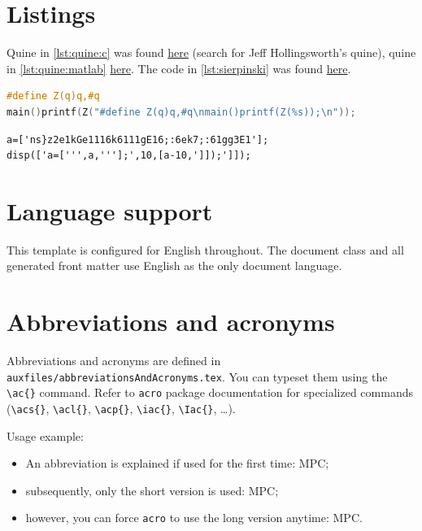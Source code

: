 \section{Listings}
Quine in \cref{lst:quine:c} was found \href{https://www.nyx.net/~gthompso/self_c.txt}{here} (search for Jeff Hollingsworth's quine),
quine in \cref{lst:quine:matlab} \href{http://blog.garritys.org/2009/10/quines.html}{here}. The code in
\cref{lst:sierpinski} was found \href{http://rosettacode.org/wiki/Sierpinski_carpet#Python}{here}.

\begin{lstlisting}[language = C, label = lst:quine:c, caption = {An elegant C quine}]
#define Z(q)q,#q
main()printf(Z("#define Z(q)q,#q\nmain()printf(Z(%s));\n"));
\end{lstlisting}

\begin{lstlisting}[label = lst:quine:matlab, caption = {An elegant MATLAB quine}]
a=['ns}z2e1kGe1116k6111gE16;:6ek7;:61gg3E1'];
disp(['a=[''',a,'''];',10,[a-10,']]);']]);
\end{lstlisting}




\section{Language support}
This template is configured for English throughout. The document class and all generated
front matter use English as the only document language.


\section{Abbreviations and acronyms}
Abbreviations and acronyms are defined in \verb|auxfiles/abbreviationsAndAcronyms.tex|.
You can typeset them using the \verb|\ac{}| command. Refer to \texttt{acro} package
documentation for specialized commands (\verb|\acs{}|, \verb|\acl{}|, \verb|\acp{}|,
\verb|\iac{}|, \verb|\Iac{}|, \ldots).

Usage example:
\begin{itemize}
  \item An abbreviation is explained if used for the first time: \ac{MPC};
  \item subsequently, only the short version is used: \ac{MPC};
  \item however, you can force \texttt{acro} to use the long version anytime: \acl{MPC}.
\end{itemize}

